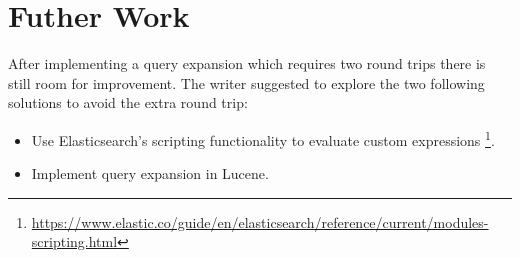 \section{Futher Work}
After implementing a query expansion which requires two round trips there is still room for improvement.
The writer suggested to explore the two following solutions to avoid the extra round trip:

\begin{itemize}
    \item Use Elasticsearch's scripting functionality to evaluate custom expressions \footnote{\url{https://www.elastic.co/guide/en/elasticsearch/reference/current/modules-scripting.html}}.
    \item Implement query expansion in Lucene.
\end{itemize}
